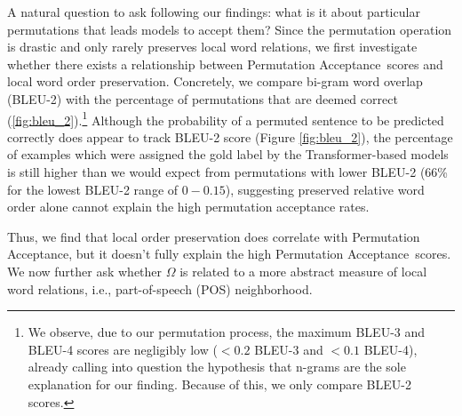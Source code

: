 \documentclass[letterpaper, 12pt]{report}
\newcommand{\PermAcc}{Permutation Acceptance} %
\begin{document}
A natural question to ask following our findings: what is it about particular permutations that leads models to accept them? Since the permutation operation is drastic and only rarely preserves local word relations, we first investigate whether there exists a relationship between \PermAcc\ scores and local word order preservation. Concretely, we compare bi-gram word overlap (BLEU-2) with the percentage of permutations that are deemed correct (\autoref{fig:bleu_2}).\footnote{We observe, due to our permutation process, the maximum BLEU-3 and BLEU-4 scores are negligibly low ($< 0.2$  BLEU-3 and $< 0.1$ BLEU-4), already calling into question the hypothesis that n-grams are the sole explanation for our finding. Because of this, we only compare BLEU-2 scores.} Although the probability of a permuted sentence to be predicted correctly does appear to track BLEU-2 score (Figure \ref{fig:bleu_2}), the percentage of examples which were assigned the gold label by the Transformer-based models is still higher than we would expect from permutations with lower BLEU-2 (66\% for the lowest BLEU-2 range of $0-0.15$), suggesting preserved relative word order alone cannot explain the high permutation acceptance rates.

Thus, we find that local order preservation does correlate with \PermAcc, but it doesn't fully explain the high \PermAcc\ scores.
We now further ask whether $\Omega$ is related to a more abstract measure of local word relations, i.e., part-of-speech (POS) neighborhood.


\end{document}
